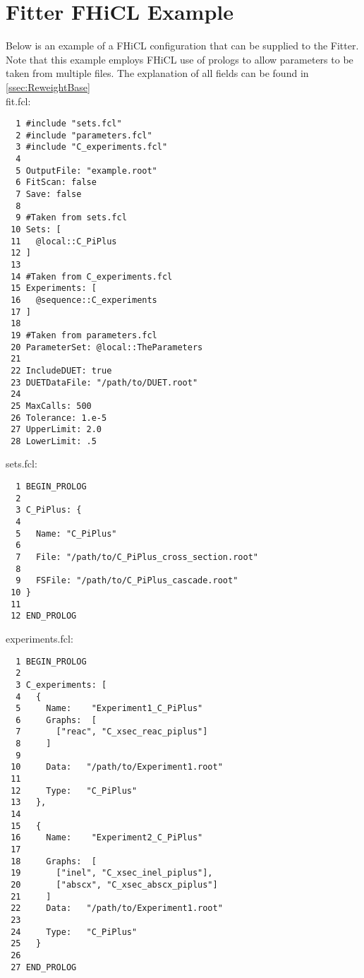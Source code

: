 \documentclass[12pt]{article}
\begin{document}
\appendix

\section{Fitter FHiCL Example}\label{app:Fitter_FHiCL}

Below is an example of a FHiCL configuration that can be supplied to the Fitter. Note that this example employs FHiCL use of prologs to allow parameters to be taken from multiple files. The explanation of all fields can be found in \ref{ssec:ReweightBase}\\

fit.fcl:
\begin{lstlisting}
  1 #include "sets.fcl"
  2 #include "parameters.fcl"
  3 #include "C_experiments.fcl"
  4 
  5 OutputFile: "example.root"
  6 FitScan: false
  7 Save: false
  8 
  9 #Taken from sets.fcl
 10 Sets: [
 11   @local::C_PiPlus
 12 ]
 13 
 14 #Taken from C_experiments.fcl
 15 Experiments: [ 
 16   @sequence::C_experiments
 17 ]
 18 
 19 #Taken from parameters.fcl
 20 ParameterSet: @local::TheParameters
 21 
 22 IncludeDUET: true
 23 DUETDataFile: "/path/to/DUET.root"
 24 
 25 MaxCalls: 500
 26 Tolerance: 1.e-5
 27 UpperLimit: 2.0
 28 LowerLimit: .5

\end{lstlisting}
\newpage

sets.fcl:
\begin{lstlisting}
  1 BEGIN_PROLOG
  2 
  3 C_PiPlus: {
  4 
  5   Name: "C_PiPlus"
  6 
  7   File: "/path/to/C_PiPlus_cross_section.root"
  8 
  9   FSFile: "/path/to/C_PiPlus_cascade.root"
 10 }
 11 
 12 END_PROLOG
\end{lstlisting}
\newpage

experiments.fcl:
\begin{lstlisting}
  1 BEGIN_PROLOG
  2 
  3 C_experiments: [
  4   {
  5     Name:    "Experiment1_C_PiPlus"
  6     Graphs:  [
  7       ["reac", "C_xsec_reac_piplus"]
  8     ]
  9 
 10     Data:   "/path/to/Experiment1.root"
 11 
 12     Type:   "C_PiPlus"
 13   },
 14 
 15   {
 16     Name:    "Experiment2_C_PiPlus"
 17 
 18     Graphs:  [
 19       ["inel", "C_xsec_inel_piplus"],
 20       ["abscx", "C_xsec_abscx_piplus"]
 21     ]
 22     Data:   "/path/to/Experiment1.root"
 23 
 24     Type:   "C_PiPlus"
 25   }
 26
 27 END_PROLOG
\end{lstlisting}
\newpage 
\end{document}
